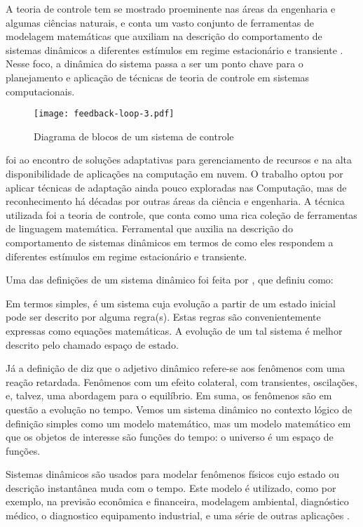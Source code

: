 A teoria de controle tem se mostrado proeminente nas áreas da engenharia e algumas ciências naturais, e conta um vasto conjunto de ferramentas de modelagem matemáticas que auxiliam na descrição do comportamento de sistemas dinâmicos a diferentes estímulos em regime estacionário e transiente \cite{Nobile2013}. Nesse foco, a dinâmica do sistema passa a ser um ponto chave para o planejamento e aplicação de técnicas de teoria de controle em sistemas computacionais. 

\begin{figure}[htb]	
	\centering
	\texttt{[image: feedback-loop-3.pdf]}
	\caption{Diagrama de blocos de um sistema de controle}
	\label{fig:feedback-nobile}	
\end{figure}

 foi ao encontro de soluções adaptativas para gerenciamento de recursos e na alta disponibilidade de aplicações na computação em nuvem. O trabalho optou por aplicar técnicas de adaptação ainda pouco exploradas nas Computação, mas de reconhecimento há décadas por outras áreas da ciência e engenharia. A técnica utilizada foi a teoria de controle, que conta como uma rica coleção de ferramentas de linguagem matemática. Ferramental que auxilia na descrição do comportamento de sistemas dinâmicos em termos de como eles respondem a diferentes estímulos em regime estacionário e transiente.

Uma das definições de um sistema dinâmico foi feita por , que definiu como:
\begin{citacao}
	Em termos simples, é um sistema cuja evolução a partir de um estado inicial pode ser descrito por alguma regra(s). Estas regras são convenientemente expressas como equações matemáticas. A evolução de um tal sistema é melhor descrito pelo chamado espaço de estado.
\end{citacao}

Já a definição de  diz que o adjetivo dinâmico refere-se aos fenômenos com uma reação retardada. Fenômenos com um efeito colateral, com transientes, oscilações, e, talvez, uma abordagem para o equilíbrio. Em suma, os fenômenos são em questão a evolução no tempo. Vemos um sistema dinâmico no contexto lógico de definição simples como um modelo matemático, mas um modelo matemático em que os objetos de interesse são funções do tempo: o universo é um espaço de funções.

Sistemas dinâmicos são usados para modelar fenômenos físicos cujo estado ou descrição instantânea muda com o tempo. Este modelo é utilizado, como por exemplo, na previsão econômica e financeira, modelagem ambiental, diagnóstico médico, o diagnostico equipamento industrial, e uma série de outras aplicações \cite{Dean1991}.

